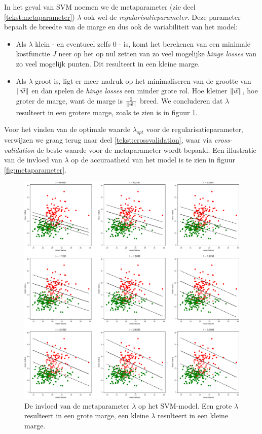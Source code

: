 \documentclass[TeamE-eindrapport]{subfiles}
\begin{document}
	In het geval van SVM noemen we de metaparameter (zie deel \ref{tekst:metaparameter}) \(\lambda\) ook wel de \textit{regularisatieparameter}. Deze parameter bepaalt de breedte van de marge en dus ook de variabiliteit van het model:
	
	\begin{itemize}
	
		\item Als \(\lambda\) klein - en eventueel zelfs \(0\) - is, komt het berekenen van een minimale kostfunctie $J$ neer op het op nul zetten van zo veel mogelijke \textit{hinge losses} van zo veel mogelijk punten. Dit resulteert in een kleine marge. 
		
		\item Als \(\lambda\) groot is, ligt er meer nadruk op het minimaliseren van de grootte van \(\left\| \vec{w} \right\|\) en dan spelen de \textit{hinge losses} een minder grote rol. Hoe kleiner \(\left\| \vec{w} \right\|\), hoe groter de marge, want de marge is \(\frac{2}{\left\| \vec{w} \right\|}\) breed. We concluderen dat \(\lambda\) resulteert in een grotere marge, zoals te zien is in figuur \ref{fig:lambda}.
	
	\end{itemize}
	
	Voor het vinden van de optimale waarde \(\lambda_{opt}\) voor de regularisatieparameter, verwijzen we graag terug naar deel \ref{tekst:crossvalidation}, waar via \textit{cross-validation} de beste waarde voor de metaparameter wordt bepaald. Een illustratie van de invloed van \(\lambda\) op de accuraatheid van het model is te zien in figuur \ref{fig:metaparameter}.
	
	\begin{figure}
		\centering
		\includegraphics[width=.9\textwidth]{lambda}
		\caption{De invloed van de metaparameter \(\lambda\) op het SVM-model. Een grote \(\lambda\) resulteert in een grote marge, een kleine \(\lambda\) resulteert in een kleine marge.}
		\label{fig:lambda}
	\end{figure}
	
\end{document}
